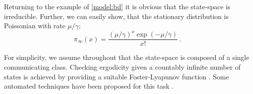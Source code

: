 \begin{example}
	Returning to the example of \autoref{model:bd} it is obvious that the state-space is irreducible.
Further, we can easily show, that the stationary distribution is Poissonian with rate $\mu/\gamma$:
	\[ \pi_{\infty}(x)=\frac{{(\mu/\gamma)}^{x}\exp(-\mu/\gamma)}{x!}\,.\]
\end{example}


For simplicity, we assume throughout that the state-space is composed of a single communicating class.
Checking ergodicity given a countably infinite number of states is achieved by providing a suitable Foster-Lyapunov function \cite{meyn2012markov}.
Some automated techniques have been proposed for this task \cite{dayar2011bounding,gupta2014scalable,milias2014optimization}.



